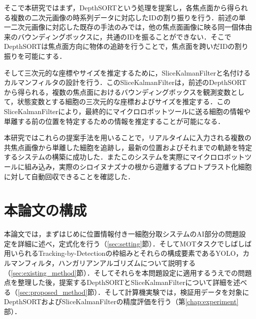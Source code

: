 そこで本研究ではまず，DepthSORTという処理を提案し，各焦点面から得られる複数の二次元画像の時系列データに対応したIDの割り振りを行う．前述の単一二次元画像に対応した既存の手法のみでは，他の焦点面画像に映る同一個体由来のバウンディングボックスに，共通のIDを振ることができない．そこでDepthSORTは焦点面方向に物体の追跡を行うことで，焦点面を跨いだIDの割り振りを可能にする．

そして三次元的な座標やサイズを推定するために，SliceKalmanFilterと名付けるカルマンフィルタの設計を行う．このSliceKalmanFilterは，前述のDepthSORTから得られる，複数の焦点面におけるバウンディングボックスを観測変数として，状態変数とする細胞の三次元的な座標およびサイズを推定する．このSliceKalmanFilterにより，最終的にマイクロロボットツールに送る細胞の情報や単離する前の位置を特定するための情報を推定することが可能になる．

本研究ではこれらの提案手法を用いることで，リアルタイムに入力される複数の共焦点画像から単離した細胞を追跡し，最新の位置およびそれまでの軌跡を特定するシステムの構築に成功した．またこのシステムを実際にマイクロロボットツールに組み込み，実際のシロイヌナズナの根から遊離するプロトプラスト化細胞に対して自動回収できることを確認した．

\section{本論文の構成}
\label{sec:outline}

本論文では，まずはじめに位置情報付き一細胞分取システムのAI部分の問題設定を詳細に述べ，定式化を行う（\ref{sec:setting}節）．そしてMOTタスクでしばしば用いられるTracking-by-Detectionの枠組みとそれらの構成要素であるYOLO，カルマンフィルタ，ハンガリアンアルゴリズムについて説明する（\ref{sec:existing_method}節）．そしてそれらを本問題設定に適用するうえでの問題点を整理した後，提案するDepthSORTとSliceKalmanFilterについて詳細を述べる（\ref{sec:proposed_method}節）．そして計算機実験では，検証用データを対象にDepthSORTおよびSliceKalmanFilterの精度評価を行う（第\ref{chap:experiment}部）．